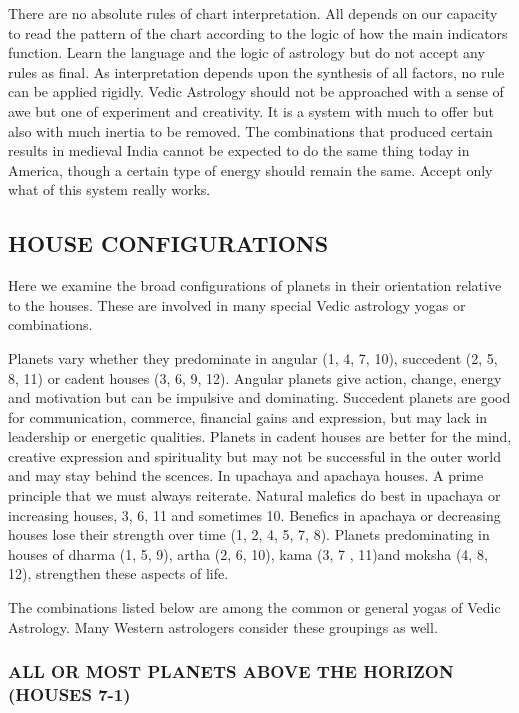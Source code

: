 There are no absolute rules of chart interpretation. All depends on our capacity to read the pattern of the chart according to the logic of how the main indicators function. Learn the language and the logic of astrology but do not accept any rules as final. As interpretation depends upon the synthesis of all factors, no rule can be applied rigidly. Vedic Astrology should not be approached with a sense of awe but one of experiment and creativity. It is a system with much to offer but also with much inertia to be removed. The combinations that produced certain results in medieval India cannot be expected to do the same thing today in America, though a certain type of energy should remain the same. Accept only what of this system really works.

 

\subsection{HOUSE CONFIGURATIONS}
 

Here we examine the broad configurations of planets in their orientation relative to the houses. These are involved in many special Vedic astrology yogas or combinations.

 

Planets vary whether they predominate in angular (1, 4, 7, 10), succedent (2, 5, 8, 11) or cadent houses (3, 6, 9, 12). Angular planets give action, change, energy and motivation but can be impulsive and dominating. Succedent planets are good for communication, commerce, financial gains and expression, but may lack in leadership or energetic qualities. Planets in cadent houses are better for the mind, creative expression and spirituality but may not be successful in the outer world and may stay behind the scences.
In upachaya and apachaya houses. A prime principle that we must always reiterate. Natural malefics do best in upachaya or increasing houses, 3, 6, 11 and sometimes 10. Benefics in apachaya or decreasing houses lose their strength over time (1, 2, 4, 5, 7, 8).
Planets predominating in houses of dharma (1, 5, 9), artha (2, 6, 10), kama (3,  7 , 11)and moksha (4, 8, 12), strengthen these aspects of life.
 

The combinations listed below are among the common or general yogas of Vedic Astrology. Many Western astrologers consider these groupings as well.

\subsubsection{ALL OR MOST PLANETS ABOVE THE HORIZON (HOUSES 7-1)}

